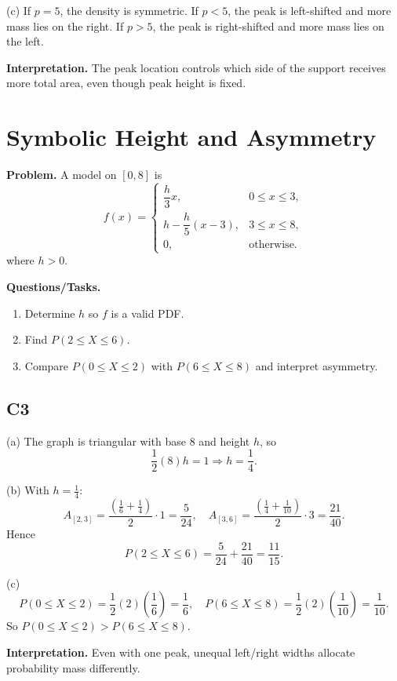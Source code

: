 (c) If $p=5$, the density is symmetric.
If $p<5$, the peak is left-shifted and more mass lies on the right.
If $p>5$, the peak is right-shifted and more mass lies on the left.

\textbf{Interpretation.}
The peak location controls which side of the support receives more total area, even though peak height is fixed.

\section{Symbolic Height and Asymmetry}

\textbf{Problem.}
A model on $[0,8]$ is
\[
f(x)=\begin{cases}
\dfrac{h}{3}x, & 0\le x\le 3,\\
h-\dfrac{h}{5}(x-3), & 3\le x\le 8,\\
0, & \text{otherwise.}
\end{cases}
\]
where $h>0$.

\textbf{Questions/Tasks.}
\begin{enumerate}[label=(\alph*)]
\item Determine $h$ so $f$ is a valid PDF.
\item Find $P(2\le X\le 6)$.
\item Compare $P(0\le X\le 2)$ with $P(6\le X\le 8)$ and interpret asymmetry.
\end{enumerate}

\subsection*{C3}
(a) The graph is triangular with base $8$ and height $h$, so
\[
\frac12(8)h=1\Rightarrow h=\frac14.
\]

(b) With $h=\frac14$:
\[
A_{[2,3]}=\frac{\left(\frac16+\frac14\right)}{2}\cdot1=\frac{5}{24},
\quad
A_{[3,6]}=\frac{\left(\frac14+\frac1{10}\right)}{2}\cdot3=\frac{21}{40}.
\]
Hence
\[
P(2\le X\le 6)=\frac{5}{24}+\frac{21}{40}=\frac{11}{15}.
\]

(c)
\[
P(0\le X\le 2)=\frac12(2)\left(\frac16\right)=\frac16,
\quad
P(6\le X\le 8)=\frac12(2)\left(\frac1{10}\right)=\frac1{10}.
\]
So $P(0\le X\le 2)>P(6\le X\le 8)$.

\textbf{Interpretation.}
Even with one peak, unequal left/right widths allocate probability mass differently.

